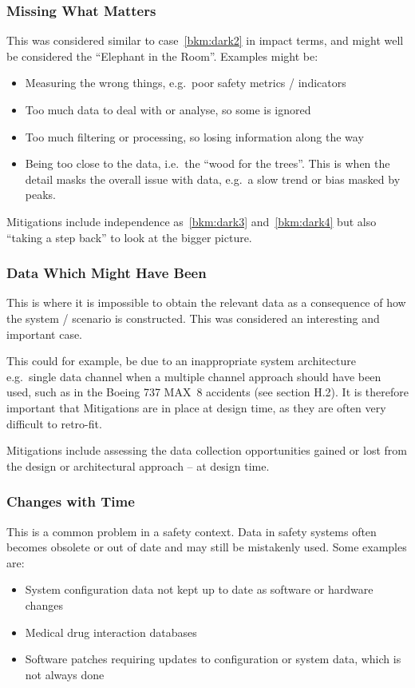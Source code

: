 \subsubsection{Missing What Matters}\label{bkm:dark5}
This was considered similar to case~\ref{bkm:dark2} in impact terms, and might well be considered the “Elephant in the Room”. Examples might be:
\begin{itemize}
\item Measuring the wrong things, e.g.\ poor safety metrics / indicators
  \item Too much data to deal with or analyse, so some is ignored
  \item Too much filtering or processing, so losing \gls{information} along the way
  \item Being too close to the data, i.e.\ the “wood for the trees”. This is when the detail masks the overall issue with data, e.g.\ a slow trend or bias masked by peaks.
\end{itemize}

Mitigations include independence as~\ref{bkm:dark3} and~\ref{bkm:dark4} but also “taking a step back” to look at the bigger picture.

\subsubsection{Data Which Might Have Been}\label{bkm:dark6}
This is where it is impossible to obtain the relevant data as a consequence of how the system / scenario is constructed. This was considered an interesting and important case.

This could for example, be due to an inappropriate system architecture e.g.\ single data channel when a multiple channel approach should have been used, such as in the Boeing 737 MAX~8 accidents (see section H.2). It is therefore important that Mitigations are in place at design time, as they are often very difficult to retro-fit.

Mitigations include assessing the data collection opportunities gained or lost from the design or architectural approach -- at design time.

\subsubsection{Changes with Time}\label{bkm:dark7}
This is a common problem in a safety context. Data in safety systems often becomes obsolete or out of date and may still be mistakenly used. Some examples are:
\begin{itemize}
\item System \gls{configuration data} not kept up to date as software or hardware changes
  \item Medical drug interaction \glspl{database}
  \item Software patches requiring updates to configuration or system data, which is not always done
\end{itemize}


